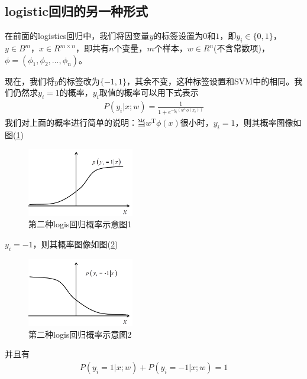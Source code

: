     \subsection{logistic回归的另一种形式}
        \par
        在前面的logistics回归中，我们将因变量$y$的标签设置为$0$和$1$，即$y_i\in \{0,1\}$，$y\in B^m$，$x\in R^{m\times n}$，即共有$n$个变量，$m$个样本，$w\in R^n$(不含常数项)，$\phi = (\phi_1,\phi_2,\dots,\phi_n)$。
        \par
        现在，我们将$y$的标签改为$\{-1,1\}$，其余不变，这种标签设置和SVM中的相同。我们仍然求$y_i = 1$的概率，$y_i$取值的概率可以用下式表示
        \begin{align*}
        P(y_i|x;w) = \frac{1}{1+e^{-y_i(w^\mathrm{T}\phi(x_i))}}
        \end{align*}
        我们对上面的概率进行简单的说明：当$w^\mathrm{T}\phi(x)$很小时，$y_i =1$，则其概率图像如图(\ref{fig:第二种logis回归概率示意图1})
            \begin{figure}[H]
            \centering
            \includegraphics[height=3cm]{images/the_second_logis_regression_probability1.jpg}
            \caption{第二种logis回归概率示意图1}
            \label{fig:第二种logis回归概率示意图1}
            \end{figure}
        $y_i = -1$，则其概率图像如图(\ref{fig:第二种logis回归概率示意图2})
            \begin{figure}[H]
            \centering
            \includegraphics[height=3cm]{images/the_second_logis_regression_probability2.jpg}
            \caption{第二种logis回归概率示意图2}
            \label{fig:第二种logis回归概率示意图2}
            \end{figure}
        并且有
        \begin{align*}
        P(y_i = 1|x;w) + P(y_i = -1|x;w) = 1
        \end{align*}
